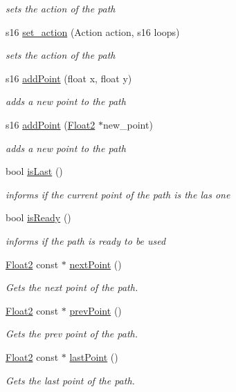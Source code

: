 \begin{DoxyCompactItemize}
\begin{DoxyCompactList}\small\item\em sets the action of the path \end{DoxyCompactList}\item 
s16 \mbox{\hyperlink{class_path_a9932d1c9742ab5c9bf1d2fea0536c0ad}{set\+\_\+action}} (Action action, s16 loops)
\begin{DoxyCompactList}\small\item\em sets the action of the path \end{DoxyCompactList}\item 
s16 \mbox{\hyperlink{class_path_aec0977970beeaa279c2c3f152aee0f88}{add\+Point}} (float x, float y)
\begin{DoxyCompactList}\small\item\em adds a new point to the path \end{DoxyCompactList}\item 
s16 \mbox{\hyperlink{class_path_a114453983549b6be3d27788272d26b2a}{add\+Point}} (\mbox{\hyperlink{class_float2}{Float2}} $\ast$new\+\_\+point)
\begin{DoxyCompactList}\small\item\em adds a new point to the path \end{DoxyCompactList}\item 
bool \mbox{\hyperlink{class_path_aeb7e40ba58a329fb01053f72ef0a6d56}{is\+Last}} ()
\begin{DoxyCompactList}\small\item\em informs if the current point of the path is the las one \end{DoxyCompactList}\item 
bool \mbox{\hyperlink{class_path_a738ebaf508fc4a35dd5a5f5f8c84e39f}{is\+Ready}} ()
\begin{DoxyCompactList}\small\item\em informs if the path is ready to be used \end{DoxyCompactList}\item 
\mbox{\hyperlink{class_float2}{Float2}} const  $\ast$ \mbox{\hyperlink{class_path_a17f70e35a36c29650f571c59a237b0e5}{next\+Point}} ()
\begin{DoxyCompactList}\small\item\em Gets the next point of the path. \end{DoxyCompactList}\item 
\mbox{\hyperlink{class_float2}{Float2}} const  $\ast$ \mbox{\hyperlink{class_path_af5da5742823a638b5bf9100b3f0b37ea}{prev\+Point}} ()
\begin{DoxyCompactList}\small\item\em Gets the prev point of the path. \end{DoxyCompactList}\item 
\mbox{\hyperlink{class_float2}{Float2}} const  $\ast$ \mbox{\hyperlink{class_path_a2ef24ce0bf3b3468ecbb4a6e0efdebfd}{last\+Point}} ()
\begin{DoxyCompactList}\small\item\em Gets the last point of the path. \end{DoxyCompactList}\end{DoxyCompactItemize}
